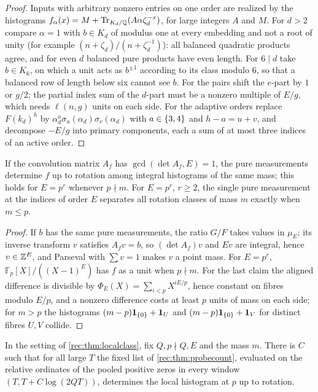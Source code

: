 \begin{proof}
Inputs with arbitrary nonzero entries on one order are realized by the histograms
$f_\alpha(x)=M+\operatorname{Tr}_{K_d/\mathbb{Q}}(A\alpha\zeta_d^{-x})$, for large integers $A$ and $M$. For $d>2$ compare $\alpha=1$ with $b\in K_d$ of
modulus one at every embedding and not a root of unity (for example $(n+\zeta_d)/(n+\zeta_d^{-1})$): all
balanced quadratic products agree, and for even $d$ balanced pure products have even length. For
$6\mid d$ take $b\in K_6$, on which a unit acts as $b^{\pm1}$ according to its class modulo $6$, so that a
balanced row of length below six cannot see $b$. For the pairs shift the $e$-part by $1$ or $g/2$; the
partial index sum of the $d$-part must be a nonzero multiple of $E/g$, which needs $\ell(n,g)$ units on
each side. For the adaptive orders replace $F(k_d)^h$ by $\alpha_d^a\sigma_u(\alpha_d)\sigma_v(\alpha_d)$ with $a\in\{3,4\}$ and
$h-a=u+v$, and decompose $-E/g$ into primary components, each a sum of at most three indices of an
active order.
\end{proof}

\begin{proposition}\label{rec:prop:probemass}
If the convolution matrix $A_f$ has $\gcd(\det A_f,E)=1$, the pure measurements determine $f$ up to rotation
among integral histograms of the same mass; this holds for $E=p^r$ whenever $p\nmid m$. For $E=p^r$, $r\ge2$,
the single pure measurement at the indices of order $E$ separates all rotation classes of mass $m$ exactly
when $m\le p$.
\end{proposition}

\begin{proof}
If $b$ has the same pure measurements, the ratio $G/F$ takes values in $\mu_E$; its inverse transform $v$
satisfies $A_fv=b$, so $(\det A_f)v$ and $Ev$ are integral, hence $v\in\mathbb{Z}^E$, and Parseval with $\sum v=1$
makes $v$ a point mass. For $E=p^r$, $\mathbb F_p[X]/((X-1)^E)$ has $f$ as a unit when $p\nmid m$. For the
last claim the aligned difference is divisible by $\Phi_E(X)=\sum_{i<p}X^{iE/p}$, hence constant on fibres
modulo $E/p$, and a nonzero difference costs at least $p$ units of mass on each side; for $m>p$ the
histograms $(m-p)\mathbf 1_{\{0\}}+\mathbf 1_U$ and $(m-p)\mathbf 1_{\{0\}}+\mathbf 1_V$ for distinct fibres $U,V$ collide.
\end{proof}

\begin{corollary}\label{rec:cor:probewindow}
In the setting of \cref{rec:thm:localclass}, fix $Q,p\nmid Q,E$ and the mass $m$. There is $C$ such that for
all large $T$ the fixed list of \cref{rec:thm:probecount}, evaluated on the relative ordinates of the pooled
positive zeros in every window $(T,T+C\log(2QT))$, determines the local histogram at $p$ up to rotation.
\end{corollary}

